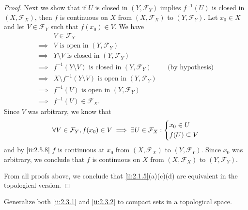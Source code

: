 \begin{proof}
  Next we show that if \(U\) is closed in \((Y, \mathcal{F}_Y)\) implies \(f^{-1}(U)\) is closed in \((X, \mathcal{F}_X)\), then \(f\) is continuous on \(X\) from \((X, \mathcal{F}_X)\) to \((Y, \mathcal{F}_Y)\).
  Let \(x_0 \in X\) and let \(V \in \mathcal{F}_Y\) such that \(f(x_0) \in V\).
  We have
  \begin{align*}
             & V \in \mathcal{F}_Y                                                                                  \\
    \implies & V \text{ is open in } (Y, \mathcal{F}_Y)                                                             \\
    \implies & Y \setminus V \text{ is closed in } (Y, \mathcal{F}_Y)                                               \\
    \implies & f^{-1}(Y \setminus V) \text{ is closed in } (Y, \mathcal{F}_Y)           &  & \text{(by hypothesis)} \\
    \implies & X \setminus f^{-1}(Y \setminus V) \text{ is open in } (Y, \mathcal{F}_Y)                             \\
    \implies & f^{-1}(V) \text{ is open in } (Y, \mathcal{F}_Y)                                                     \\
    \implies & f^{-1}(V) \in \mathcal{F}_X.
  \end{align*}
  Since \(V\) was arbitrary, we know that
  \[
    \forall V \in \mathcal{F}_Y, f(x_0) \in V \implies \exists U \in \mathcal{F}_X : \begin{dcases}
      x_0 \in U \\
      f(U) \subseteq V
    \end{dcases}
  \]
  and by \cref{ii:2.5.8} \(f\) is continuous at \(x_0\) from \((X, \mathcal{F}_X)\) to \((Y, \mathcal{F}_Y)\).
  Since \(x_0\) was arbitrary, we conclude that \(f\) is continuous on \(X\) from \((X, \mathcal{F}_X)\) to \((Y, \mathcal{F}_Y)\).

  From all proofs above, we conclude that \cref{ii:2.1.5}(a)(c)(d) are equivalent in the topological version.
\end{proof}

\begin{ex}\label{ii:ex:2.5.17}
  Generalize both \cref{ii:2.3.1} and \cref{ii:2.3.2} to compact sets in a topological space.
\end{ex}

